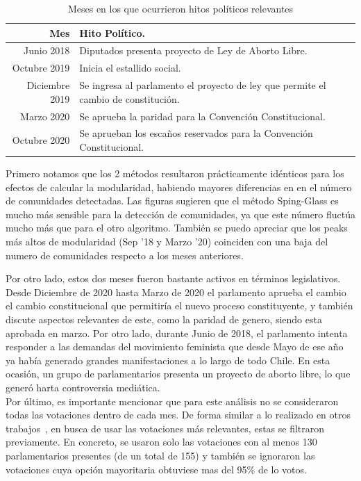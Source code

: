 \documentclass{proyectotesis}
\begin{document}
\begin{table}[ht!]
    \centering
    \caption{Meses en los que ocurrieron hitos políticos relevantes}
    \label{hp} 
    \begin{tabular}{r|l}
    Mes & Hito Político.\\
    \hline
    Junio 2018 & Diputados presenta proyecto de Ley de Aborto Libre.\\
    Octubre 2019 & Inicia el estallido social.\\
    Diciembre 2019 & Se ingresa al parlamento el proyecto de ley que permite el cambio de constitución.\\
    Marzo 2020 & Se aprueba la paridad para la Convención Constitucional.\\
    Octubre 2020 & Se aprueban los escaños reservados para la Convención Constitucional.
    \end{tabular}
\end{table}


Primero notamos que los 2 métodos resultaron prácticamente idénticos para los efectos de calcular la modularidad, habiendo mayores diferencias en en el número de comunidades detectadas. Las figuras sugieren que el método Sping-Glass es mucho más sensible para la detección de comunidades, ya que este número fluctúa mucho más que para el otro algoritmo. También se puedo apreciar que los peaks más altos de modularidad (Sep ’18 y Marzo ’20) coinciden con una baja del numero de comunidades respecto a los meses anteriores.

Por otro lado, estos dos meses fueron bastante activos en términos legislativos. Desde Diciembre de 2020 hasta Marzo de 2020 el parlamento aprueba el cambio el cambio constitucional que permitiría el nuevo proceso constituyente, y también discute aspectos relevantes de este, como la paridad de genero, siendo esta aprobada en marzo. Por otro lado, durante Junio de 2018, el parlamento intenta responder a las demandas del movimiento feminista que desde Mayo de ese año ya había generado grandes manifestaciones a lo largo de todo Chile. En esta ocasión, un grupo de parlamentarios presenta un proyecto de aborto libre, lo que generó harta controversia mediática.\\

Por último, es importante mencionar que para este análisis no se consideraron todas las votaciones dentro de cada mes. De forma similar a lo realizado en otros trabajos~\cite{andris_rise_2015, schoch_legislators_2020}, en busca de usar las votaciones más relevantes, estas se filtraron previamente. En concreto, se usaron solo las votaciones con al menos 130 parlamentarios presentes (de un total de 155) y también se ignoraron las votaciones cuya opción mayoritaria obtuviese mas del 95\% de lo votos.
\end{document}
